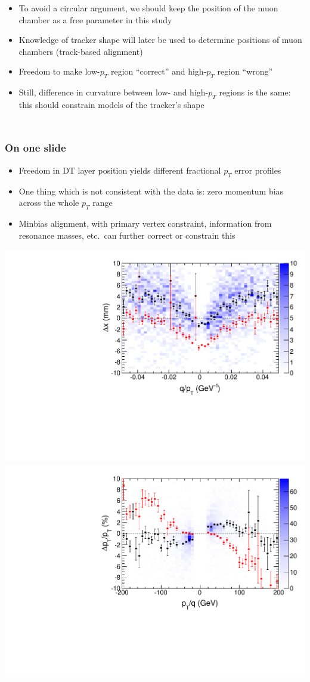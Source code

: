 \documentclass[compress]{beamer}
\begin{document}
\begin{frame}
\begin{columns}
\begin{itemize}
\item To avoid a circular argument, we should keep the position of the muon chamber as a free parameter in this study

\item Knowledge of tracker shape will later be used to determine positions of muon chambers (track-based alignment)

\item Freedom to make low-$p_T$ region ``correct'' and high-$p_T$ region ``wrong''

\item Still, difference in curvature between low- and high-$p_T$ regions is the same: this should constrain models of the tracker's shape
\end{itemize}
\end{columns}
\end{frame}

\begin{frame}
\frametitle{On one slide}

\begin{itemize}
\item Freedom in DT layer position yields different fractional $p_T$ error profiles
\item One thing which is not consistent with the data is: zero momentum bias across the whole $p_T$ range
\item Minbias alignment, with primary vertex constraint, information
  from resonance masses, etc.\ can further correct or constrain this
\end{itemize}

\vspace{0.25 cm}
\includegraphics[width=0.5\linewidth]{residuals_real_both.pdf}\mbox{\hspace{0.2 cm}}\includegraphics[width=0.5\linewidth]{momenta_real_both.pdf}
\end{frame}
\end{document}
